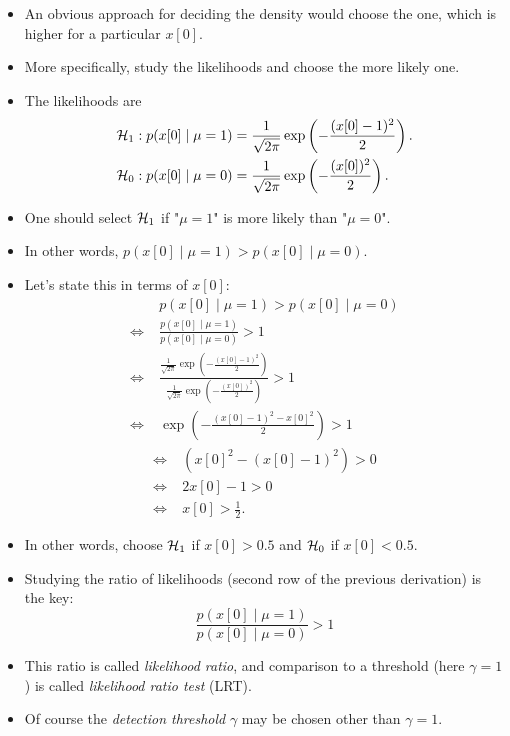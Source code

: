 \documentclass[10pt, aspectratio=169]{beamer} %
\begin{document}
\begin{frame}[allowframebreaks=0.8]
\begin{itemize}
\item An obvious approach for deciding the density would choose
the one, which is higher for a particular $x[0]$.
\item More specifically, study the likelihoods and choose the more likely one.
\item The likelihoods are
\begin{align*}
{\cal H}_1 &: p(x[0]\mid \mu=1) =  \frac{1}{\sqrt{2\pi}}\exp\left(-\frac{(x[0]-1)^2}{2}\right).\\
{\cal H}_0 &: p(x[0]\mid \mu=0) =  \frac{1}{\sqrt{2\pi}}\exp\left(-\frac{(x[0])^2}{2}\right).
\end{align*}
\item One should select ${\cal H}_1$ if "$\mu = 1$" is more likely than "$\mu = 0$".
\item In other words, $p(x[0]\mid \mu=1) > p(x[0]\mid \mu=0)$.
\item Let's state this in terms of $x[0]$:
\begin{align*}
&\; p(x[0]\mid \mu=1) > p(x[0]\mid \mu=0) \\
\Leftrightarrow &\; \frac{p(x[0]\mid \mu=1)}{p(x[0]\mid \mu=0)} > 1\\
\Leftrightarrow &\; \frac{\frac{1}{\sqrt{2\pi}}\exp\left(-\frac{(x[0]-1)^2}{2}\right)}{\frac{1}{\sqrt{2\pi}}\exp\left(-\frac{(x[0])^2}{2}\right)} > 1\\
\Leftrightarrow &\; \exp\left(-\frac{(x[0]-1)^2 - x[0]^2}{2}\right) > 1
\end{align*}
\framebreak
\begin{align*}
\Leftrightarrow &\; (x[0]^2 - (x[0]-1)^2) > 0\\
\Leftrightarrow &\; 2x[0] - 1 > 0\\
\Leftrightarrow &\; x[0] > \frac12.
\end{align*}

\item In other words, choose ${\cal H}_1$ if $x[0] > 0.5$ and ${\cal H}_0$ if
$x[0] < 0.5$.

\item Studying the ratio of likelihoods (second row of the previous derivation)
is the key:
\[
\frac{p(x[0]\mid \mu=1)}{p(x[0]\mid \mu=0)} > 1
\]

\item This ratio is called \emph{likelihood ratio}, and comparison
to a threshold (here $\gamma = 1$) is called \emph{likelihood ratio test} (LRT).

\item Of course the \textit{detection threshold} $\gamma$ may be chosen other than $\gamma = 1$.


\end{itemize}
\end{frame}
\end{document}

